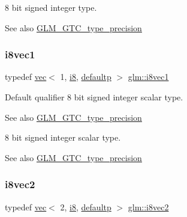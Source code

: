 8 bit signed integer type. \begin{DoxySeeAlso}{See also}
\hyperlink{group__gtc__type__precision}{G\+L\+M\+\_\+\+G\+T\+C\+\_\+type\+\_\+precision} 
\end{DoxySeeAlso}
\mbox{\label{group__gtc__type__precision_ga1e3db56de9a181840090416b6a5bd5f7}} 
\subsubsection{\texorpdfstring{i8vec1}{i8vec1}}
{\footnotesize\ttfamily typedef \hyperlink{structglm_1_1vec}{vec}$<$ 1, \hyperlink{group__gtc__type__precision_gaae064be68b7d36cd7910c16e8ad18bba}{i8}, \hyperlink{namespaceglm_a36ed105b07c7746804d7fdc7cc90ff25a9d21ccd8b5a009ec7eb7677befc3bf51}{defaultp} $>$ \hyperlink{group__gtc__type__precision_ga1e3db56de9a181840090416b6a5bd5f7}{glm\+::i8vec1}}

Default qualifier 8 bit signed integer scalar type. \begin{DoxySeeAlso}{See also}
\hyperlink{group__gtc__type__precision}{G\+L\+M\+\_\+\+G\+T\+C\+\_\+type\+\_\+precision}
\end{DoxySeeAlso}
8 bit signed integer scalar type. \begin{DoxySeeAlso}{See also}
\hyperlink{group__gtc__type__precision}{G\+L\+M\+\_\+\+G\+T\+C\+\_\+type\+\_\+precision} 
\end{DoxySeeAlso}
\mbox{\label{group__gtc__type__precision_gade57e4b55fe2b2345a4f2ac2b149cd32}} 
\subsubsection{\texorpdfstring{i8vec2}{i8vec2}}
{\footnotesize\ttfamily typedef \hyperlink{structglm_1_1vec}{vec}$<$ 2, \hyperlink{group__gtc__type__precision_gaae064be68b7d36cd7910c16e8ad18bba}{i8}, \hyperlink{namespaceglm_a36ed105b07c7746804d7fdc7cc90ff25a9d21ccd8b5a009ec7eb7677befc3bf51}{defaultp} $>$ \hyperlink{group__gtc__type__precision_gade57e4b55fe2b2345a4f2ac2b149cd32}{glm\+::i8vec2}}

